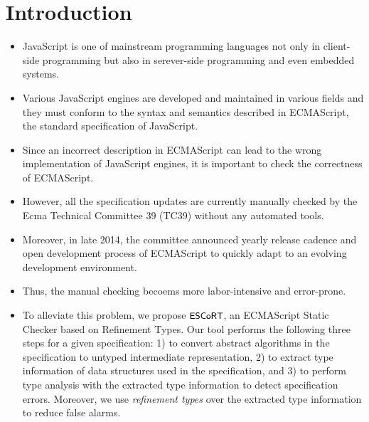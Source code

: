 \section{Introduction}\label{sec:intro}

\begin{itemize}
  \item JavaScript is one of mainstream programming languages not only in
    client-side programming but also in serever-side programming and even
    embedded systems.

  \item Various JavaScript engines are developed and maintained in various
    fields and they must conform to the syntax and semantics described in
    ECMAScript, the standard specification of JavaScript.

  \item Since an incorrect description in ECMAScript can lead to the wrong
    implementation of JavaScript engines, it is important to check the
    correctness of ECMAScript.

  \item However, all the specification updates are currently manually checked by
    the Ecma Technical Committee 39 (TC39) without any automated tools.

  \item Moreover, in late 2014, the committee announced yearly release cadence
    and open development process of ECMAScript to quickly adapt to an evolving
    development environment.

  \item Thus, the manual checking becoems more labor-intensive and error-prone.

  \item To alleviate this problem, we propose $\textsf{\small ESCoRT}$, an ECMAScript Static
    Checker based on Refinement Types.  Our tool performs the following three
    steps for a given specification: 1) to convert abstract algorithms in the
    specification to untyped intermediate representation, 2) to extract type
    information of data structures used in the specification, and 3) to perform
    type analysis with the extracted type information to detect specification
    errors.  Moreover, we use \textit{refinement types} over the extracted type
    information to reduce false alarms.  
\end{itemize}

